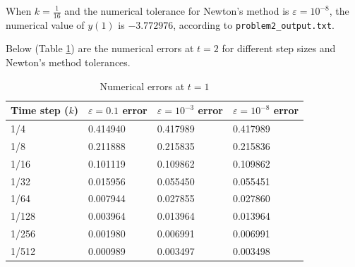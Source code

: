 \documentclass{homework}
\begin{document}
\begin{arabicparts}
		\questionpart When $k=\frac{1}{16}$ and the numerical tolerance for Newton's method is $\varepsilon = 10^{-8}$, the numerical value of $y(1)$ is $-3.772976$, according to \lstinline{problem2_output.txt}.
		
		\questionpart Below (Table \ref{table:p2}) are the numerical errors at $t=2$ for different step sizes and Newton's method tolerances.
		\begin{table}[htb]
			\centering
			\begin{tabular}{@{}llll@{}}
				\toprule
				Time step ($k$) & $\varepsilon = 0.1$ error & $\varepsilon=10^{-3}$ error & $\varepsilon =10^{-8}$ error \\
				\midrule
				1/4 & 0.414940 & 0.417989 & 0.417989 \\
				1/8 & 0.211888 & 0.215835 & 0.215836 \\
				1/16 & 0.101119 & 0.109862 & 0.109862 \\
				1/32 & 0.015956 & 0.055450 & 0.055451 \\
				1/64 & 0.007944 & 0.027855 & 0.027860 \\
				1/128 & 0.003964 & 0.013964 & 0.013964 \\
				1/256 & 0.001980 & 0.006991 & 0.006991\\
				1/512 & 0.000989 & 0.003497 & 0.003498 \\
				\bottomrule
			\end{tabular}
			\caption{Numerical errors at $t=1$}
			\label{table:p2}
		\end{table}
	\end{arabicparts}
\end{document}
